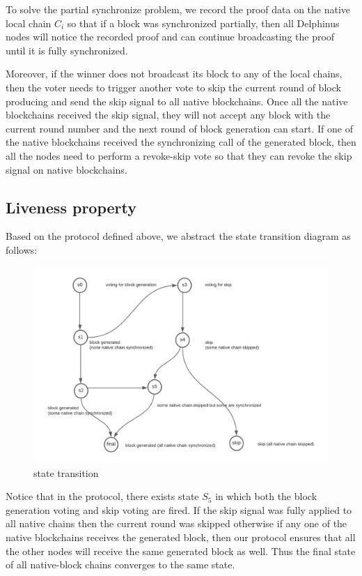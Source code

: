 \documentclass[pageno]{jpaper}
\begin{document}
To solve the partial synchronize problem, we record the proof data on the native local chain $C_i$ so that if a block was synchronized partially, then all Delphinus nodes will notice the recorded proof and can continue broadcasting the proof until it is fully synchronized.

Moreover, if the winner does not broadcast its block to any of the local chains, then the voter needs to trigger another vote to skip the current round of block producing and send the skip signal to all native blockchains. Once all the native blockchains received the skip signal, they will not accept any block with the current round number and the next round of block generation can start. If one of the native blockchains received the synchronizing call of the generated block, then all the nodes need to perform a revoke-skip vote so that they can revoke the skip signal on native blockchains.

\subsection{Liveness property}
Based on the protocol defined above, we abstract the state transition diagram as follows:

\begin{figure}[!ht]
\label{state-transition}
\begin{center}
\includegraphics[scale=0.2]{state-transition.png}
\end{center}
\caption{state transition}
\end{figure}

Notice that in the protocol, there exists state $S_5$ in which both the block generation voting and skip voting are fired. If the skip signal was fully applied to all native chains then the current round was skipped otherwise if any one of the native blockchains receives the generated block, then our protocol ensures that all the other nodes will receive the same generated block as well. Thus the final state of all native-block chains converges to the same state.
\end{document}
